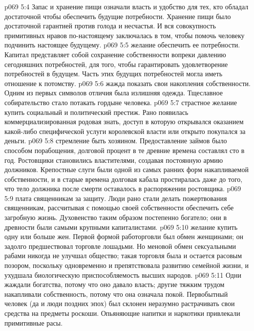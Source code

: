 \vs p069 5:4 \bibnobreakspace {} Запас и хранение пищи означали власть и удобство для тех, кто обладал достаточной  чтобы обеспечить будущие потребности. Хранение пищи было достаточной гарантией против голода и несчастья. И вся совокупность примитивных нравов по\hyp{}настоящему заключалась в том, чтобы помочь человеку подчинить настоящее будущему.
\vs p069 5:5 \bibnobreakspace {} желание обеспечить ее потребности. Капитал представляет собой сохранение собственности вопреки давлению сегодняшних потребностей, для того, чтобы гарантировать удовлетворение потребностей в будущем. Часть этих будущих потребностей могла иметь отношение к потомству.
\vs p069 5:6 \bibnobreakspace {} жажда показать свои накопления собственности. Одним из первых символов отличия была излишняя одежда. Тщеславное собирательство стало потакать гордыне человека.
\vs p069 5:7 \bibnobreakspace {} страстное желание купить социальный и политический престиж. Рано появилась коммерциализированная родовая знать, доступ в которую открывался оказанием какой\hyp{}либо специфической услуги королевской власти или открыто покупался за деньги.
\vs p069 5:8 \bibnobreakspace {} стремление быть хозяином. Предоставление займов было способом порабощения, долговой процент в те древние времена составлял сто в год. Ростовщики становились властителями, создавая постоянную армию должников. Крепостные слуги были одной из самых ранних форм накапливаемой собственности, и в старые времена долговая кабала простиралась даже до того, что тело должника после смерти оставалось в распоряжении ростовщика.
\vs p069 5:9 \bibnobreakspace {} плата священникам за защиту. Люди рано стали делать пожертвования священникам, рассчитывая с помощью своей собственности обеспечить себе загробную жизнь. Духовенство таким образом постепенно богатело; они в древности были самыми крупными капиталистами.
\vs p069 5:10 \bibnobreakspace {} желание купить одну или больше жен. Первой формой работорговли был обмен женщинами; он задолго предшествовал торговле лошадьми. Но меновой обмен сексуальными рабами никогда не улучшал общество; такая торговля была и остается расовым позором, поскольку одновременно и препятствовала развитию семейной жизни, и ухудшала биологическую приспособляемость высших народов.
\vs p069 5:11 \bibnobreakspace {} Одни жаждали богатства, потому что оно давало власть; другие тяжким трудом накапливали собственность, потому что она означала покой. Первобытный человек (да и люди поздних эпох) был склонен неразумно растрачивать свои средства на предметы роскоши. Опьяняющие напитки и наркотики привлекали примитивные расы.
